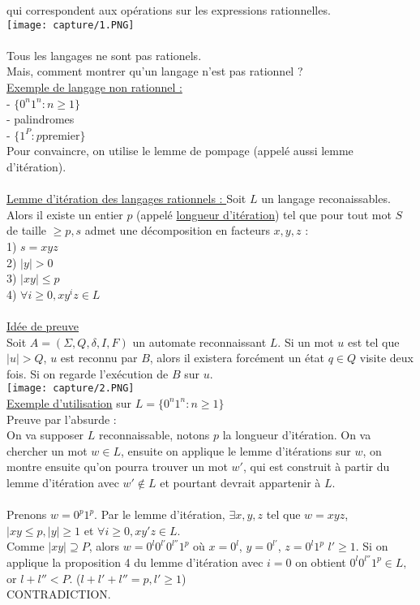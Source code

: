 \documentclass{article}
\begin{document}
    qui correspondent aux opérations sur les expressions rationnelles. \\ 
    \texttt{[image: capture/1.PNG]} \\
    \\
    Tous les langages ne sont pas rationels. \\
    Mais, comment montrer qu'un langage n'est pas rationnel ? \\ 
    \underline{Exemple de langage non rationnel : } \\
    - $\{0^n1^n : n \ge 1\}$ \\
    - palindromes \\
    - $\{1^P : p \text{premier}\}$ \\ 
    Pour convaincre, on utilise le lemme de pompage (appelé aussi lemme d'itération). \\
    \\
    \underline{Lemme d'itération des langages rationnels : } Soit $L$ un langage reconaissables. 
    Alors il existe un entier $p$ (appelé \underline{longueur d'itération}) tel que pour tout mot $S$ 
    de taille $\ge p, s$ admet une décomposition en facteurs $x,y,z$ : \\
    1) $s=xyz$ \\
    2) $\mid y \mid > 0$ \\
    3) $\mid xy \mid \le p$ \\
    4) $\forall i \ge 0, xy^iz \in L$ \\
    \\
    \newpage
    \underline{Idée de preuve} \\
    Soit $A=(\Sigma, Q, \delta, I, F)$ un automate reconnaissant $L$. Si un mot $u$ est tel que $\mid u \mid > Q$, $u$ est reconnu par $B$, alors il existera forcément un état $q \in Q$ visite deux fois. 
    Si on regarde l'exécution de $B$ sur $u$. \\
    \texttt{[image: capture/2.PNG]}  \\
    \underline{Exemple d'utilisation} sur $L=\{0^n1^n : n \ge 1\}$ \\
    Preuve par l'absurde : \\
    On va supposer $L$ reconnaissable, notons $p$ la longueur d'itération. On va chercher un mot $w \in L$,
    ensuite on applique le lemme d'itérations sur $w$, on montre ensuite qu'on pourra trouver un mot $w'$, qui est construit
    à partir du lemme d'itération avec $w' \notin L$ et pourtant devrait appartenir à $L$.  \\ 
    \\
    Prenons $w=0^p1^p$. Par le lemme d'itération, $\exists x,y,z$ tel que $w=xyz$, $\mid xy \le p, \mid y \mid \ge 1$ 
    et $\forall i \ge 0, xy'z \in L$. \\
    Comme $\mid xy \mid \supseteq P$, alors $w=0^l0^{l'}0^{l''}1^p$ où $x=0^l$, $y=0^{l'}$, $z=0^l1^p$ $l' \ge 1$. Si on applique la proposition 4
    du lemme d'itération avec $i=0$ on obtient $0^l0^{l''}1^p \in L,$ or $l+l'' < P$. ($l+l'+l''=p, l' \ge 1$) \\
    CONTRADICTION.
\end{document}

